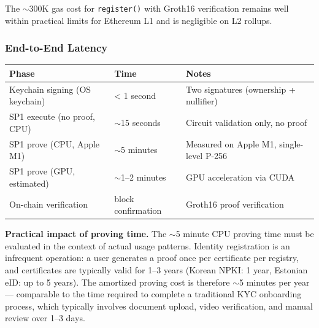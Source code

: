 \documentclass[11pt, a4paper]{article}
\begin{document}
The $\sim$300K gas cost for \texttt{register()} with Groth16
verification remains well within practical limits for Ethereum L1 and is
negligible on L2 rollups.

\subsubsection{End-to-End Latency}\label{end-to-end-latency}

\begin{longtable}[]{@{}
  >{\raggedright\arraybackslash}p{}
  >{\raggedright\arraybackslash}p{}
  >{\raggedright\arraybackslash}p{}@{}}
\toprule\noalign{}
\begin{minipage}[b]{\linewidth}\raggedright
Phase
\end{minipage} & \begin{minipage}[b]{\linewidth}\raggedright
Time
\end{minipage} & \begin{minipage}[b]{\linewidth}\raggedright
Notes
\end{minipage} \\
\midrule\noalign{}
\endhead
\bottomrule\noalign{}
\endlastfoot
Keychain signing (OS keychain) & \textless{} 1 second & Two signatures
(ownership + nullifier) \\
SP1 execute (no proof, CPU) & $\sim$15 seconds & Circuit
validation only, no proof \\
SP1 prove (CPU, Apple M1) & $\sim$5 minutes & Measured on Apple
M1, single-level P-256 \\
SP1 prove (GPU, estimated) & $\sim$1--2 minutes & GPU
acceleration via CUDA \\
On-chain verification & 1 block confirmation & Groth16 proof
verification \\
\end{longtable}

\textbf{Practical impact of proving time.} The $\sim$5 minute
CPU proving time must be evaluated in the context of actual usage
patterns. Identity registration is an infrequent operation: a user
generates a proof once per certificate per registry, and certificates
are typically valid for 1--3 years (Korean NPKI: 1 year, Estonian eID:
up to 5 years). The amortized proving cost is therefore $\sim$5
minutes per year --- comparable to the time required to complete a
traditional KYC onboarding process, which typically involves document
upload, video verification, and manual review over 1--3 days.
\end{document}

